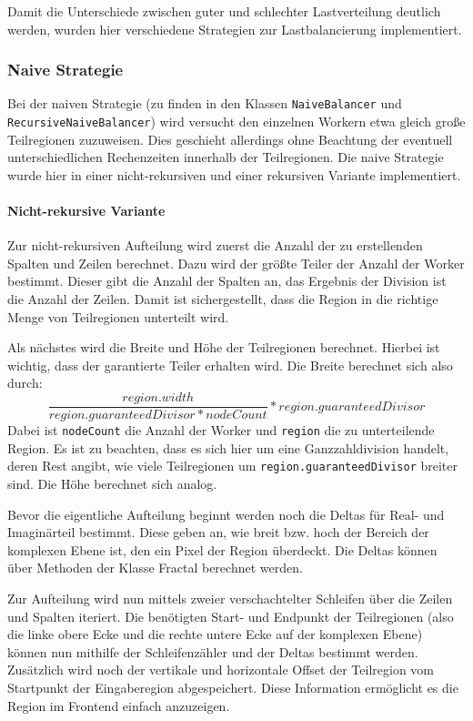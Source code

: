 Damit die Unterschiede zwischen guter und schlechter Lastverteilung deutlich werden, wurden hier verschiedene Strategien zur Lastbalancierung implementiert.

\subsubsection{Naive Strategie}

Bei der naiven Strategie (zu finden in den Klassen \verb|NaiveBalancer| und \\ \verb|RecursiveNaiveBalancer|) wird versucht den einzelnen Workern etwa gleich große Teilregionen zuzuweisen.
Dies geschieht allerdings ohne Beachtung der eventuell unterschiedlichen Rechenzeiten innerhalb der Teilregionen.
Die naive Strategie wurde hier in einer nicht-rekursiven und einer rekursiven Variante implementiert.

\paragraph*{Nicht-rekursive Variante}\label{lastbalancierung_naiv}
Zur nicht-rekursiven Aufteilung wird zuerst die Anzahl der zu erstellenden Spalten und Zeilen berechnet.
Dazu wird der größte Teiler der Anzahl der Worker bestimmt. Dieser gibt die Anzahl der Spalten an, das Ergebnis der Division ist die Anzahl der Zeilen.
Damit ist sichergestellt, dass die Region in die richtige Menge von Teilregionen unterteilt wird.

Als nächstes wird die Breite und Höhe der Teilregionen berechnet. Hierbei ist wichtig, dass der garantierte Teiler erhalten wird.
Die Breite berechnet sich also durch:
\begin{equation*}
	\frac{region.width}{region.guaranteedDivisor * nodeCount} * region.guaranteedDivisor
\end{equation*}
Dabei ist \verb|nodeCount| die Anzahl der Worker und \verb|region| die zu unterteilende Region.
Es ist zu beachten, dass es sich hier um eine Ganzzahldivision handelt, deren Rest angibt, wie viele Teilregionen um \verb|region.guaranteedDivisor| breiter sind.
Die Höhe berechnet sich analog.

Bevor die eigentliche Aufteilung beginnt werden noch die Deltas für Real- und Imaginärteil bestimmt.
Diese geben an, wie breit bzw. hoch der Bereich der komplexen Ebene ist, den ein Pixel der Region überdeckt.
Die Deltas können über Methoden der Klasse Fractal berechnet werden.

Zur Aufteilung wird nun mittels zweier verschachtelter Schleifen über die Zeilen und Spalten iteriert.
Die benötigten Start- und Endpunkt der Teilregionen (also die linke obere Ecke und die rechte untere Ecke auf der komplexen Ebene) können nun mithilfe der Schleifenzähler und der Deltas bestimmt werden.
Zusätzlich wird noch der vertikale und horizontale Offset der Teilregion vom Startpunkt der Eingaberegion abgespeichert. Diese Information ermöglicht es die Region im Frontend einfach anzuzeigen.

